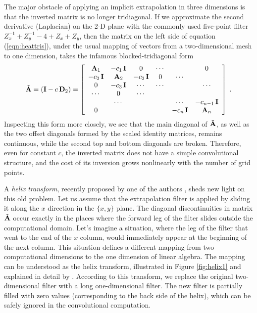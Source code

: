 The major obstacle of applying an implicit extrapolation in three
dimensions is that the inverted matrix is no longer tridiagonal. If we
approximate the second derivative (Laplacian) on the 2-D plane with
the commonly used five-point filter $Z_x^{-1} + Z_y^{-1} -4 + Z_x +
Z_y$, then the matrix on the left side of equation
(\ref{eqn:heattris}), under the usual mapping of vectors from a
two-dimensional mesh to one dimension, takes the infamous
blocked-tridiagonal form \cite{birk}
\begin{equation}\label{eqn:matrix2}
  \tilde{\bold{A}} = \left(\bold{I} -c\,\bold{D}_2\right) =
  \left[\begin{array}{cccccc}
  \bold{A}_1   & -c_1 \,\bold{I}    &  0     & \cdots &        & 0      \\
  -c_2 \,\bold{I}    & \bold{A}_2   & -c_2 \,\bold{I}    & 0      & \cdots &        \\
  0      & -c_3 \,\bold{I}     & \cdots & \cdots &        & \cdots \\
  \cdots & 0      & \cdots &        &        &        \\
         & \cdots &        &        & \cdots & -c_{n-1} \,\bold{I}    \\
  0      &        &        &        & -c_{n} \,\bold{I}    &
  \bold{A}_n
  \end{array}\right]\;.
\end{equation}
Inspecting this form more closely, we see that the main diagonal of
$\tilde{\bold{A}}$, as well as the two offset diagonals formed by the
scaled identity matrices, remains continuous, while the second top and
bottom diagonals are broken. Therefore, even for constant $c$, the
inverted matrix does not have a simple convolutional structure, and
the cost of its inversion grows nonlinearly with the number of grid
points.
\par
A \emph{helix transform}, recently proposed by one of the authors
\cite{Claerbout.sep.95.jon1}, sheds new light on this old problem.
Let us assume that the extrapolation filter is applied by sliding it
along the $x$ direction in the $\{x,y\}$ plane. The diagonal
discontinuities in matrix $\tilde{\bold{A}}$ occur exactly in the
places where the forward leg of the filter slides outside the
computational domain. Let's imagine a situation, where the leg of the
filter that went to the end of the $x$ column, would immediately
appear at the beginning of the next column. This situation defines a
different mapping from two computational dimensions to the one
dimension of linear algebra. The mapping can be understood as the
helix transform, illustrated in Figure \ref{fig:helix1} and explained
in detail by . According to this
transform, we replace the original two-dimensional filter with a long
one-dimensional filter. The new filter is partially filled with zero
values (corresponding to the back side of the helix), which can be
safely ignored in the convolutional computation.

